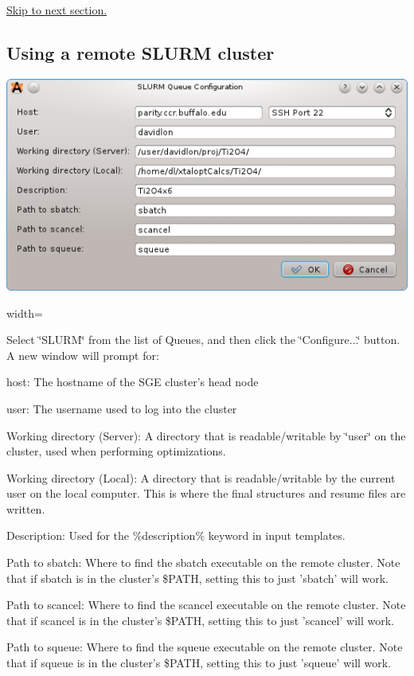 \hyperlink{tut-xo_files}{Skip to next section.}\hypertarget{tut-xo_remoteslurm}{}\subsection{Using a remote S\-L\-U\-R\-M cluster}\label{tut-xo_remoteslurm}
 
\begin{DoxyImage}
\includegraphics{opt-set-slurm.png}
\caption{width=}
\end{DoxyImage}


Select \char`\"{}\-S\-L\-U\-R\-M\char`\"{} from the list of Queues, and then click the \char`\"{}\-Configure...\char`\"{} button. A new window will prompt for\-:
\begin{DoxyItemize}
\item host\-: The hostname of the S\-G\-E cluster's head node
\item user\-: The username used to log into the cluster
\item Working directory (Server)\-: A directory that is readable/writable by \char`\"{}user\char`\"{} on the cluster, used when performing optimizations.
\item Working directory (Local)\-: A directory that is readable/writable by the current user on the local computer. This is where the final structures and resume files are written.
\item Description\-: Used for the \%description\% keyword in input templates.
\item Path to sbatch\-: Where to find the sbatch executable on the remote cluster. Note that if sbatch is in the cluster's \$\-P\-A\-T\-H, setting this to just 'sbatch' will work.
\item Path to scancel\-: Where to find the scancel executable on the remote cluster. Note that if scancel is in the cluster's \$\-P\-A\-T\-H, setting this to just 'scancel' will work.
\item Path to squeue\-: Where to find the squeue executable on the remote cluster. Note that if squeue is in the cluster's \$\-P\-A\-T\-H, setting this to just 'squeue' will work.
\end{DoxyItemize}


